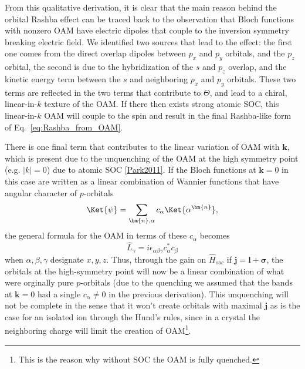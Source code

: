 From this qualitative derivation, it is clear that the main reason behind the orbital Rashba effect can be traced back to the observation that Bloch functions with nonzero OAM have electric dipoles that couple to the inversion symmetry breaking electric field. We identified two sources that lead to the effect: the first one comes from the direct overlap dipoles between $p_x$ and $p_y$ orbitals, and the $p_z$ orbital\cite{Petersen2000}, the second is due to the hybridization of the $s$ and $p_z$ overlap, and the kinetic energy term between the $s$ and neighboring $p_x$ and $p_y$ orbitals\cite{Go2016}. These two terms are reflected in the two terms that contribute to $\Theta$, and lead to a chiral, linear-in-$k$ texture of the OAM.
If there then exists strong atomic SOC, this linear-in-$k$ OAM will couple to the spin and result in the final Rashba-like form of Eq.~\ref{eq:Rashba_from_OAM}.


There is one final term that contributes to the linear variation of OAM with $\bm{k}$, which is present due to the unquenching of the OAM at the high symmetry point (e.g. $|k|=0$) due to atomic SOC \ref{Park2011}.
If the Bloch functions at $\bm{k}=0$ in this case are written as a linear combination of Wannier functions that have angular character of $p$-orbitals
\begin{equation}
\Ket{\psi} = \sum_{\bm{n},\alpha} c_\alpha \Ket{\alpha^{\bm{n}}},
\end{equation}
the general formula for the OAM in terms of these $c_\alpha$ becomes
\begin{equation}
	\hat{L}_{\gamma}= i \epsilon_{\alpha \beta \gamma} c^*_\alpha c_\beta
\end{equation}
when $\alpha,\beta,\gamma$ designate $x,y,z$.
Thus, through the gain on $\hat{H}_{soc}$ if $\bm{j} = \bm{l} + \bm{\sigma}$, the orbitals at the high-symmetry point will now be a linear combination of what were orginally pure $p$-orbitals (due to the quenching we assumed that the bands at $\bm{k}=0$ had a single $c_\alpha \neq 0$ in the previous derivation).
This unquenching will not be complete in the sense that it won't create orbitals with maximal $\bm{j}$ as is the case for an isolated ion through the Hund's rules, since in a crystal the neighboring charge will limit the creation of OAM\footnote{This is the reason why without SOC the OAM is fully quenched.}.


